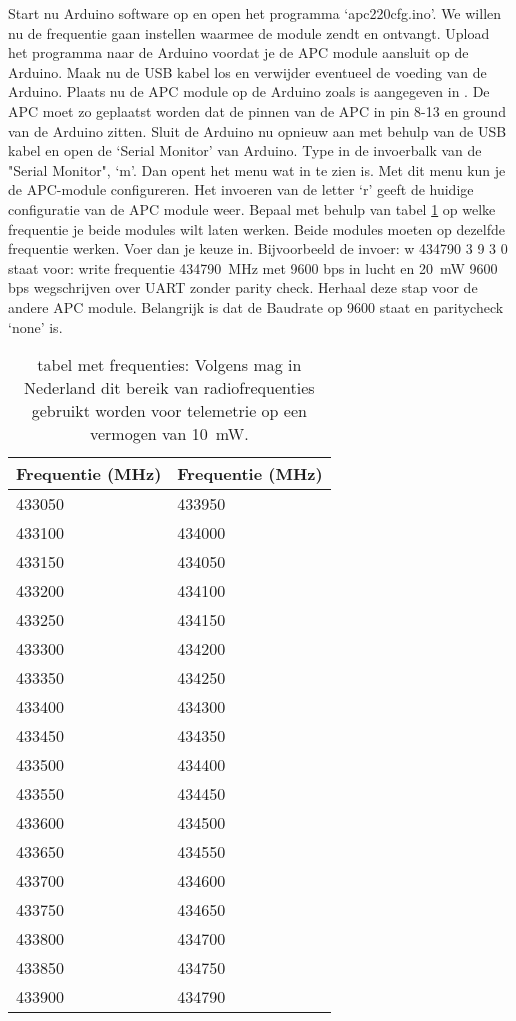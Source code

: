 Start nu Arduino software op en open het programma `apc220cfg.ino'. We
willen nu de frequentie gaan instellen waarmee de module zendt en
ontvangt. Upload het programma naar de Arduino voordat je de APC module
aansluit op de Arduino. Maak nu de USB kabel los en verwijder eventueel
de voeding van de Arduino. Plaats nu de APC module op de Arduino zoals
is aangegeven in . De APC moet zo
geplaatst worden dat de pinnen van de APC in pin 8-13 en ground van de
Arduino zitten. Sluit de Arduino nu opnieuw aan met behulp van de USB
kabel en open de `Serial Monitor' van Arduino. Type in de invoerbalk van
de "Serial Monitor", `m'. Dan opent het menu wat in
 te zien is. Met dit menu kun je de APC-module
configureren. Het invoeren van de letter `r' geeft de huidige
configuratie van de APC module weer. Bepaal met behulp van tabel
\ref{table:frequenties} op welke frequentie je beide modules wilt laten
werken. Beide modules moeten op dezelfde frequentie werken. Voer dan je
keuze in. Bijvoorbeeld de invoer: w 434790 3 9 3 0 staat voor: write
frequentie \SI{434790}{\MHz} met 9600 bps in lucht en
\SI{20}{\milli\watt} 9600 bps wegschrijven over UART zonder parity check.
Herhaal deze stap voor de andere APC module. Belangrijk is dat de Baudrate op
9600 staat en paritycheck `none' is.

\begin{table}
    \centering
    \begin{tabular}{ l l }
        \hline
        Frequentie (\si{\mega\hertz}) & Frequentie (\si{\mega\hertz}) \\
        \hline
        433050 & 433950 \\
        433100 & 434000 \\
        433150 & 434050 \\
        433200 & 434100 \\
        433250 & 434150 \\
        433300 & 434200 \\
        433350 & 434250 \\
        433400 & 434300 \\
        433450 & 434350 \\
        433500 & 434400 \\
        433550 & 434450 \\
        433600 & 434500 \\
        433650 & 434550 \\
        433700 & 434600 \\
        433750 & 434650 \\
        433800 & 434700 \\
        433850 & 434750 \\
        433900 & 434790 \\
        \hline
    \end{tabular}
    \caption{tabel met frequenties: Volgens \cite{Radio} mag in Nederland
             dit bereik van radiofrequenties gebruikt worden voor telemetrie
             op een vermogen van \SI{10}{\milli\watt}.}
    \label{table:frequenties}
\end{table}



